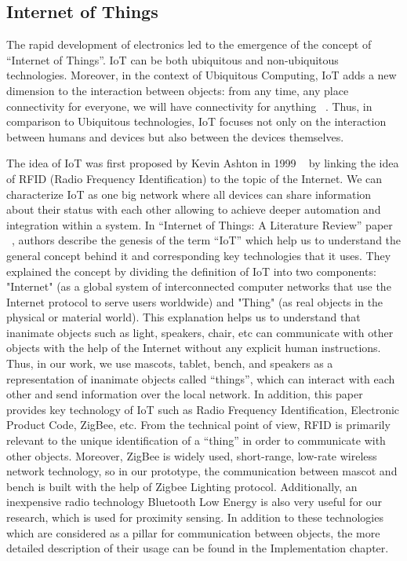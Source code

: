 \subsection{Internet of Things}
\label{sec:Internet of Things}
The rapid development of electronics led to the emergence of the concept of “Internet of Things”. IoT can be both ubiquitous and non-ubiquitous technologies. Moreover, in the context of Ubiquitous Computing, IoT adds a new dimension to the interaction between objects: from any time, any place connectivity for everyone, we will have connectivity for anything ~\cite{tan2010future}. Thus, in comparison to Ubiquitous technologies, IoT focuses not only on the interaction between humans and devices but also between the devices themselves.
\par The idea of IoT was first proposed by Kevin Ashton in 1999 ~\cite{ashton2009internet}  by linking the idea of RFID (Radio Frequency Identification) to the topic of the Internet. We can characterize IoT as one big network where all devices can share information about their status with each other allowing to achieve deeper automation and integration within a system. In “Internet of Things: A Literature Review” paper ~\cite{madakam2015internet}, authors describe the genesis of the term “IoT” which help us to understand the general concept behind it and corresponding key technologies that it uses. They explained the concept by dividing the definition of IoT into two components: "Internet" (as a global system of interconnected computer networks that use the Internet protocol to serve users worldwide) and "Thing" (as real objects in the physical or material world). This explanation helps us to understand that inanimate objects such as light, speakers, chair, etc can communicate with other objects with the help of the Internet without any explicit human instructions. Thus, in our work, we use mascots, tablet, bench, and speakers as a representation of inanimate objects called “things”, which can interact with each other and send information over the local network. In addition, this paper provides key technology of IoT such as Radio Frequency Identification, Electronic Product Code, ZigBee, etc. From the technical point of view, RFID is primarily relevant to the unique identification of a “thing” in order to communicate with other objects. Moreover, ZigBee is widely used, short-range, low-rate wireless network technology, so in our prototype, the communication between mascot and bench is built with the help of Zigbee Lighting protocol. Additionally, an inexpensive radio technology Bluetooth Low Energy is also very useful for our research, which is used for proximity sensing. In addition to these technologies which are considered as a pillar for communication between objects, the more detailed description of their usage can be found in the Implementation chapter.
